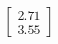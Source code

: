 \documentclass[preview]{standalone}
\begin{document}
\begin{align*}
\begin{bmatrix} 2.71 \\ 3.55 \end{bmatrix}
\end{align*}
\end{document}
